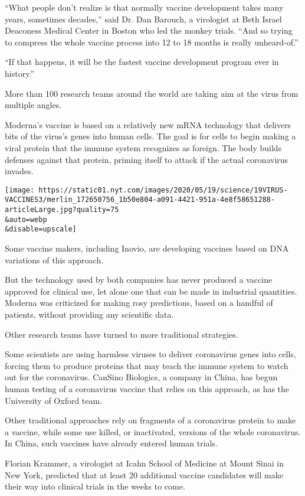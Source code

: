 ``What people don't realize is that normally vaccine development takes
many years, sometimes decades,'' said Dr. Dan Barouch, a virologist at
Beth Israel Deaconess Medical Center in Boston who led the monkey
trials. ``And so trying to compress the whole vaccine process into 12 to
18 months is really unheard-of.''

``If that happens, it will be the fastest vaccine development program
ever in history.''

More than 100 research teams around the world are taking aim at the
virus from multiple angles.

Moderna's vaccine is based on a relatively new mRNA technology that
delivers bits of the virus's genes into human cells. The goal is for
cells to begin making a viral protein that the immune system recognizes
as foreign. The body builds defenses against that protein, priming
itself to attack if the actual coronavirus invades.

\texttt{[image: https://static01.nyt.com/images/2020/05/19/science/19VIRUS-VACCINES3/merlin\_172650756\_1b50e804-a091-4421-951a-4e8f58651288-articleLarge.jpg?quality=75\\\&auto=webp\\\&disable=upscale]}

Some vaccine makers, including Inovio, are developing vaccines based on
DNA variations of this approach.

But the technology used by both companies has never produced a vaccine
approved for clinical use, let alone one that can be made in industrial
quantities. Moderna was criticized for making rosy predictions, based on
a handful of patients, without providing any scientific data.

Other research teams have turned to more traditional strategies.

Some scientists are using harmless viruses to deliver coronavirus genes
into cells, forcing them to produce proteins that may teach the immune
system to watch out for the coronavirus. CanSino Biologics, a company in
China, has begun human testing of a coronavirus vaccine that relies on
this approach, as has the University of Oxford team.

Other traditional approaches rely on fragments of a coronavirus protein
to make a vaccine, while some use killed, or inactivated, versions of
the whole coronavirus. In China, such vaccines have already entered
human trials.

Florian Krammer, a virologist at Icahn School of Medicine at Mount Sinai
in New York, predicted that at least 20 additional vaccine candidates
will make their way into clinical trials in the weeks to come.

